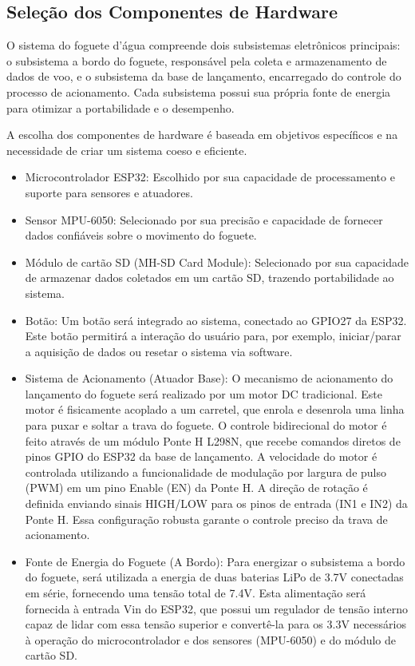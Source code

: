 \subsection{Seleção dos Componentes de Hardware}
O sistema do foguete d'água compreende dois subsistemas eletrônicos principais: o subsistema a bordo do foguete, responsável pela coleta e armazenamento de dados de voo, e o subsistema da base de lançamento, encarregado do controle do processo de acionamento. Cada subsistema possui sua própria fonte de energia para otimizar a portabilidade e o desempenho.

A escolha dos componentes de hardware é baseada em objetivos específicos e na necessidade de criar um sistema coeso e eficiente.
\begin{itemize}
    \item Microcontrolador ESP32: Escolhido por sua capacidade de processamento e suporte para sensores e atuadores.
    \item Sensor MPU-6050: Selecionado por sua precisão e capacidade de fornecer dados confiáveis sobre o movimento do foguete.
    \item Módulo de cartão SD (MH-SD Card Module): Selecionado por sua capacidade de armazenar dados coletados em um cartão SD, trazendo portabilidade ao sistema.
    \item Botão: Um botão será integrado ao sistema, conectado ao GPIO27 da ESP32. Este botão permitirá a interação do usuário para, por exemplo, iniciar/parar a aquisição de dados ou resetar o sistema via software.
    \item Sistema de Acionamento (Atuador Base): O mecanismo de acionamento do lançamento do foguete será realizado por um motor DC tradicional. Este motor é fisicamente acoplado a um carretel, que enrola e desenrola uma linha para puxar e soltar a trava do foguete. O controle bidirecional do motor é feito através de um módulo Ponte H L298N, que recebe comandos diretos de pinos GPIO do ESP32 da base de lançamento. A velocidade do motor é controlada utilizando a funcionalidade de modulação por largura de pulso (PWM) em um pino Enable (EN) da Ponte H. A direção de rotação é definida enviando sinais HIGH/LOW para os pinos de entrada (IN1 e IN2) da Ponte H. Essa configuração robusta garante o controle preciso da trava de acionamento.
    \item Fonte de Energia do Foguete (A Bordo): Para energizar o subsistema a bordo do foguete, será utilizada a energia de duas baterias LiPo de 3.7V conectadas em série, fornecendo uma tensão total de 7.4V. Esta alimentação será fornecida à entrada Vin do ESP32, que possui um regulador de tensão interno capaz de lidar com essa tensão superior e convertê-la para os 3.3V necessários à operação do microcontrolador e dos sensores (MPU-6050) e do módulo de cartão SD.

\end{itemize}

